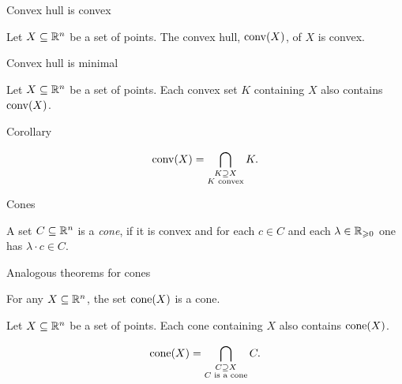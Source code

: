\begin{frame}{Convex hull is convex}


\begin{theorem}
  \label{conv:thr:1}
  Let $X\subseteq\mathbb{R}^n$ be a set of points. The convex hull, $\operatorname{\mathrm{conv}}(X)$,  of $X$
  is convex. 
\end{theorem}

  
\end{frame}


\begin{frame}
  
\end{frame}

\begin{frame}{Convex hull is minimal}


\begin{theorem}
  \label{conv:thr:2}
  Let $X\subseteq\mathbb{R}^n$ be a set of points. Each convex set $K$ containing $X$
  also contains $\operatorname{\mathrm{conv}}(X)$. 
\end{theorem}
  
\end{frame}



\begin{frame}
  
\end{frame}


\begin{frame}{Corollary}


\begin{displaymath}
  \operatorname{\mathrm{conv}}(X) = \bigcap_{\substack{K \supseteq X\\ K \text{  convex}}} K. 
\end{displaymath}
\end{frame}



\begin{frame}{Cones}
\begin{definition}
  \label{conv:def:4}
  A set $C\subseteq\mathbb{R}^n$ is a \emph{cone}, if it is convex and for each $c \in
  C$ and each $\lambda \in \mathbb{R}_{\geqslant0}$ one has  $\lambda\cdot c \in C$. 
\end{definition}
\end{frame}


\begin{frame}{Analogous theorems for cones} 
  \begin{theorem}
  \label{conv:thr:8}
  For any $X\subseteq\mathbb{R}^n$, the set $\operatorname{\mathrm{cone}}(X)$ is a cone. 
\end{theorem}

\begin{theorem}
  \label{conv:thr:9}
  Let $X\subseteq\mathbb{R}^n$ be a set of points. Each cone containing $X$ also
  contains $\operatorname{\mathrm{cone}}(X)$. 
\end{theorem}
\bigskip 
\begin{displaymath}
  \operatorname{\mathrm{cone}}(X) = \bigcap_{\substack{C \supseteq X\\ C \text{  is a cone}}} C. 
\end{displaymath}
\end{frame}



